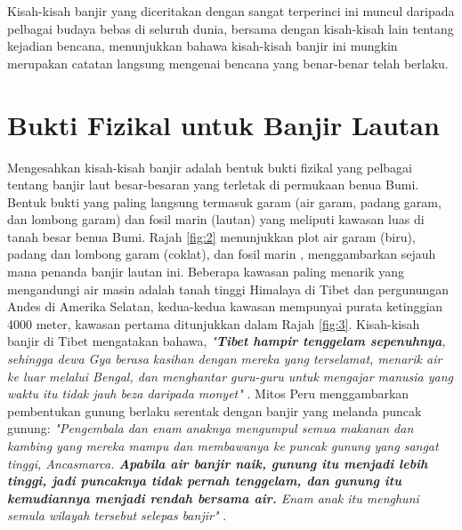 \documentclass[10pt,twocolumn,letterpaper]{article}
\begin{document}
Kisah-kisah banjir yang diceritakan dengan sangat terperinci ini muncul daripada pelbagai budaya bebas di seluruh dunia, bersama dengan kisah-kisah lain tentang kejadian bencana, menunjukkan bahawa kisah-kisah banjir ini mungkin merupakan catatan langsung mengenai bencana yang benar-benar telah berlaku.

\section{Bukti Fizikal untuk Banjir Lautan}

Mengesahkan kisah-kisah banjir adalah bentuk bukti fizikal yang pelbagai tentang banjir laut besar-besaran yang terletak di permukaan benua Bumi. Bentuk bukti yang paling langsung termasuk garam (air garam, padang garam, dan lombong garam) dan fosil marin (lautan) yang meliputi kawasan luas di tanah besar benua Bumi. Rajah \ref{fig:2} menunjukkan plot air garam (biru), padang dan lombong garam (coklat), dan fosil marin \cite{15,16,86,87}, menggambarkan sejauh mana penanda banjir lautan ini.
Beberapa kawasan paling menarik yang mengandungi air masin adalah tanah tinggi Himalaya di Tibet dan pergunungan Andes di Amerika Selatan, kedua-kedua kawasan mempunyai purata ketinggian 4000 meter, kawasan pertama ditunjukkan dalam Rajah \ref{fig:3}. Kisah-kisah banjir di Tibet mengatakan bahawa, \textit{"\textbf{Tibet hampir tenggelam sepenuhnya}, sehingga dewa Gya berasa kasihan dengan mereka yang terselamat, menarik air ke luar melalui Bengal, dan menghantar guru-guru untuk mengajar manusia yang waktu itu tidak jauh beza daripada monyet"} \cite{3}. Mitos Peru menggambarkan pembentukan gunung berlaku serentak dengan banjir yang melanda puncak gunung: \textit{"Pengembala dan enam anaknya mengumpul semua makanan dan kambing yang mereka mampu dan membawanya ke puncak gunung yang sangat tinggi, Ancasmarca. \textbf{Apabila air banjir naik, gunung itu menjadi lebih tinggi, jadi puncaknya tidak pernah tenggelam, dan gunung itu kemudiannya menjadi rendah bersama air.} Enam anak itu menghuni semula wilayah tersebut selepas banjir"} \cite{3}.
\end{document}
